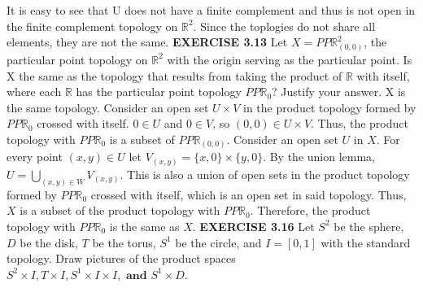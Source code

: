 \documentclass[12pt]{article}
\begin{document}
  \newline \newline
  It is easy to see that U does not have a finite complement and thus is not open in the finite complement topology on \(\mathbb{R}^2\).
  \newline \newline
  Since the toplogies do not share all elements, they are not the same.
  \newpage
  \noindent
  \textbf{EXERCISE 3.13} Let \(X = PP\mathbb{R}^2_{(0,0)}\), the particular point topology on \(\mathbb{R}^2\) with the origin serving as the particular point. Is X the same as the topology that results from taking the product of \(\mathbb{R}\) with itself, where each \(\mathbb{R}\) has the particular point topology \(PP\mathbb{R}_0\)? Justify your answer.
  \newline \newline
  X is the same topology.
  \newline \newline
  Consider an open set \(U \times V\) in the product topology formed by \(PP\mathbb{R}_0\) crossed with itself.
  \newline
  \(0 \in U\) and \(0 \in V\), so \((0,0) \in U \times V\).
  \newline
  Thus, the product topology with \(PP\mathbb{R}_0\) is a subset of \(PP\mathbb{R}_{(0,0)}\).
  \newline \newline
  Consider an open set \(U\) in \(X\).
  \newline
  For every point \((x,y) \in U\) let \(V_{(x,y)} = \{x,0\} \times \{y,0\}\).
  \newline
  By the union lemma, \(U = \bigcup_{(x,y) \in W}V_{(x,y)}\).
  \newline
  This is also a union of open sets in the product topology formed by \(PP\mathbb{R}_0\) crossed with itself, which is an open set in said topology.
  \newline
  Thus, \(X\) is a subset of the product topology with \(PP\mathbb{R}_0\).
  \newline \newline
  Therefore, the product topology with \(PP\mathbb{R}_0\) is the same as \(X\).
  \newpage
  \noindent
  \textbf{EXERCISE 3.16} Let \(S^2\) be the sphere, \(D\) be the disk, \(T\) be the torus, \(S^1\) be the circle, and \(I = [0,1]\) with the standard topology. Draw pictures of the product spaces \(S^2 \times I, T \times I, S^1 \times I\times I, \textbf{ and } S^1 \times D\).
  \newline \newline
\end{document}
